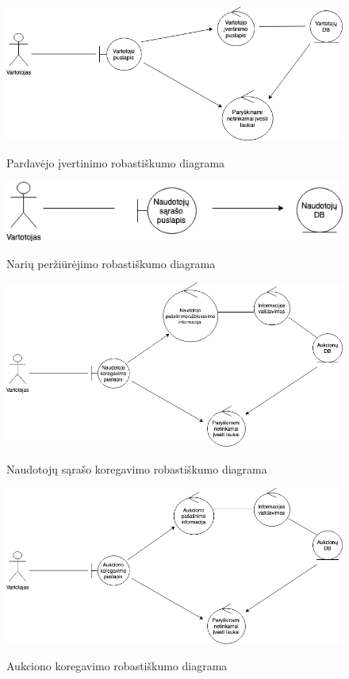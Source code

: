 \documentclass{VUMIFPSkursinis}
\begin{document}
		\begin{figure}[H]
		\centering
		\includegraphics[width=\linewidth]{img/ivertinimas.png}
		\label{fig:ivertinimas}
		\caption{Pardavėjo įvertinimo robastiškumo diagrama}
	\end{figure}

		\begin{figure}[H]
		\centering
		\includegraphics[width=\linewidth]{img/nariai.png}
		\label{fig:narys}
		\caption{Narių peržiūrėjimo robastiškumo diagrama}
	\end{figure}

		\begin{figure}[H]
		\centering
		\includegraphics[width=\linewidth]{img/pasalinti.png}
		\label{fig:salinti}
		\caption{Naudotojų sąrašo koregavimo robastiškumo diagrama}
	\end{figure}

		\begin{figure}[H]
		\centering
		\includegraphics[width=\linewidth]{img/aukcpasalinti.png}
		\label{fig:aukckoreg}
		\caption{Aukciono koregavimo robastiškumo diagrama}
	\end{figure}
\end{document}
